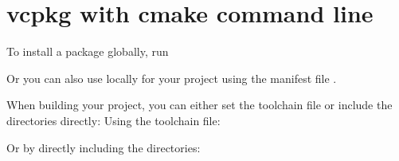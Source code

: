 \chapter{vcpkg with cmake command line}
\hypertarget{md_docs_2own__docs_2vcpkg__premier_2vcpkg__with__cmake__cli}{}\label{md_docs_2own__docs_2vcpkg__premier_2vcpkg__with__cmake__cli}
\label{md_docs_2own__docs_2vcpkg__premier_2vcpkg__with__cmake__cli_autotoc_md267}%
%
 To install a package globally, run


\begin{DoxyCode}{0}

\end{DoxyCode}

\begin{DoxyItemize}
\item Or you can also use locally for your project using the manifest file {\ttfamily {}}.
\item When building your project, you can either set the toolchain file or include the directories directly\+: Using the toolchain file\+:
\end{DoxyItemize}


\begin{DoxyCode}{0}

\end{DoxyCode}



\begin{DoxyItemize}
\item Or by directly including the directories\+:
\end{DoxyItemize}


\begin{DoxyCode}{0}

\end{DoxyCode}
 